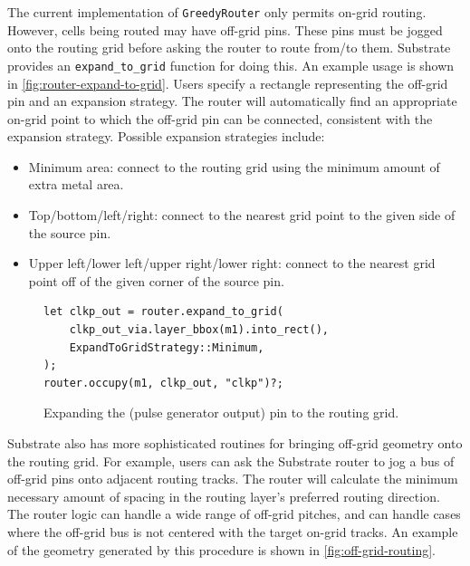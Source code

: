 The current implementation of \verb|GreedyRouter| only permits on-grid routing.
However, cells being routed may have off-grid pins. These pins must be jogged onto
the routing grid before asking the router to route from/to them. Substrate
provides an \verb|expand_to_grid| function for doing this. An example usage is shown in \ref{fig:router-expand-to-grid}.
Users specify a rectangle representing the off-grid pin and an expansion strategy. The router
will automatically find an appropriate on-grid point to which the off-grid pin can be connected,
consistent with the expansion strategy. Possible expansion strategies include:
\begin{itemize}
\item Minimum area: connect to the routing grid using the minimum amount of extra metal area.
\item Top/bottom/left/right: connect to the nearest grid point to the given side of the source pin.
\item Upper left/lower left/upper right/lower right: connect to the nearest grid point off of the given corner of the source pin.
\end{itemize}

\begin{figure}[H] \centering
\begin{verbatim}
let clkp_out = router.expand_to_grid(
    clkp_out_via.layer_bbox(m1).into_rect(),
    ExpandToGridStrategy::Minimum,
);
router.occupy(m1, clkp_out, "clkp")?;
\end{verbatim}
\caption{Expanding the (pulse generator output) pin to the routing grid. \label{fig:precharge-m1-routing-code}}
\end{figure}


Substrate also has more sophisticated routines for bringing off-grid geometry onto the routing grid.
For example, users can ask the Substrate router to jog a bus of off-grid pins onto adjacent routing tracks.
The router will calculate the minimum necessary amount of spacing in the routing layer's preferred routing direction.
The router logic can handle a wide range of off-grid pitches, and can handle cases where the off-grid bus is not centered
with the target on-grid tracks. An example of the geometry generated by this procedure is shown in \ref{fig:off-grid-routing}.

